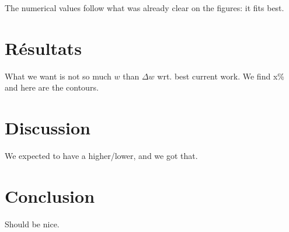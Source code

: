 \documentclass[../main/main.tex]{subfiles}
\begin{document}
The numerical values follow what was already clear on the figures: it fits best.

\section{Résultats}\label{sec:simres}
What we want is not so much $w$ than $\Delta w$ wrt. best current work. We find
x\% and here are the contours.

\section{Discussion}\label{sec:simdisc}
We expected to have a higher/lower, and we got that.

\section{Conclusion}\label{sec:simccl}

Should be nice.


\clearpage

\thispagestyle{plain}
\vfill
\minilof
\vfill
\minilot
\vfill


\shorthandoff{:}

\end{document}

